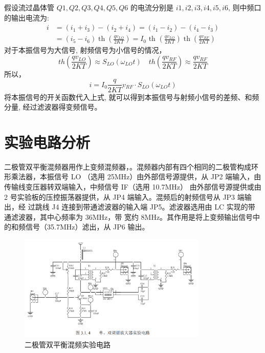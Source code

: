 \documentclass{../source/Experiment}
\begin{document}
    假设流过晶体管 $Q1,Q2,Q3,Q4,Q5,Q6$ 的电流分别是 $i1,i2,i3,i4,i5,i6$, 则中频口的输出电流为:
    $$
    \begin{aligned}
    i &=\left(i_{1}+i_{3}\right)-\left(i_{2}+i_{4}\right)=\left(i_{1}-i_{2}\right)-\left(i_{4}-i_{3}\right) \\
    &=\left(i_{5}-i_{6}\right) \operatorname{th}\left(\frac{q v_{L O}}{2 K T}\right)=I_{0} \text { th }\left(\frac{q v_{L O}}{2 K T}\right) \operatorname{th}\left(\frac{q v_{R F}}{2 K T}\right)
    \end{aligned}
    $$
    对于本振信号为大信号, 射频信号为小信号的情况，
    $$
    t h\left(\frac{q v_{L O}}{2 K T}\right) \approx S_{L O}\left(\omega_{L O} t\right) \quad t h\left(\frac{q v_{R F}}{2 K T}\right) \approx \frac{q v_{R F}}{2 K T}
    $$
    所以，
    $$
    i=I_{0} \frac{q}{2 K T} v_{R F} \cdot S_{L O}\left(\omega_{L O} t\right)
    $$
    将本振信号的开关函数代入上式, 就可以得到本振信号与射频小信号的差频、和频分量, 经过滤波器得变频信号。
    \section{实验电路分析}

    

    二极管双平衡混频器用作上变频混频器，。混频器内部有四个相同的二极管构成环形乘法器，本振信号 LO
    （选用 25MHz）由外部信号源提供，从 JP2 端输入，由传输线变压器转双端输入，中频信号 IF（选用 10.7MHz）
    由外部信号源提供或由 2 号实验板的压控振荡器提供，从 JP4 端输入。混频后的射频信号从 JP3 端输出，经
    过跳线 J4 连接到带通滤波器的输入端 JP5。滤波器选用由 LC 实现的带通滤波器，其中心频率为 36MHz，带
    宽约 8MHz。其作用是将上变频输出信号中的和频信号（35.7MHz）滤出，从 JP6 输出。
    \begin{figure}[H]
        \centering
        \includegraphics[width = 0.8\textwidth]{pic/fig2.png}
        \caption{二极管双平衡混频实验电路}
    \end{figure}
\end{document}
